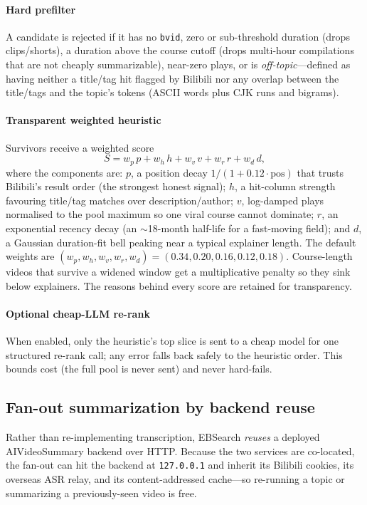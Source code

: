 \documentclass[conference]{IEEEtran}
\begin{document}
\paragraph{Hard prefilter} A candidate is rejected if it has no \texttt{bvid},
zero or sub-threshold duration (drops clips/shorts), a duration above the
course cutoff (drops multi-hour compilations that are not cheaply
summarizable), near-zero plays, or is \emph{off-topic}---defined as having
neither a title/tag hit flagged by Bilibili nor any overlap between the
title/tags and the topic's tokens (ASCII words plus CJK runs and bigrams).

\paragraph{Transparent weighted heuristic} Survivors receive a weighted score
$$
S = w_p\,p + w_h\,h + w_v\,v + w_r\,r + w_d\,d,
$$
where the components are: $p$, a position decay $1/(1+0.12\cdot\text{pos})$ that
trusts Bilibili's result order (the strongest honest signal); $h$, a
hit-column strength favouring title/tag matches over description/author; $v$,
log-damped plays normalised to the pool maximum so one viral course cannot
dominate; $r$, an exponential recency decay (an $\sim$18-month half-life for a
fast-moving field); and $d$, a Gaussian duration-fit bell peaking near a typical
explainer length. The default weights are
$(w_p,w_h,w_v,w_r,w_d)=(0.34,0.20,0.16,0.12,0.18)$. Course-length videos that
survive a widened window get a multiplicative penalty so they sink below
explainers. The reasons behind every score are retained for transparency.

\paragraph{Optional cheap-LLM re-rank} When enabled, only the heuristic's top
slice is sent to a cheap model for one structured re-rank call; any error falls
back safely to the heuristic order. This bounds cost (the full pool is never
sent) and never hard-fails.

\subsection{Fan-out summarization by backend reuse}
\label{sec:fanout}

Rather than re-implementing transcription, EBSearch \emph{reuses} a deployed
AIVideoSummary backend over HTTP. Because the two services are co-located, the
fan-out can hit the backend at \texttt{127.0.0.1} and inherit its Bilibili
cookies, its overseas ASR relay, and its content-addressed cache---so
re-running a topic or summarizing a previously-seen video is free.
\end{document}
